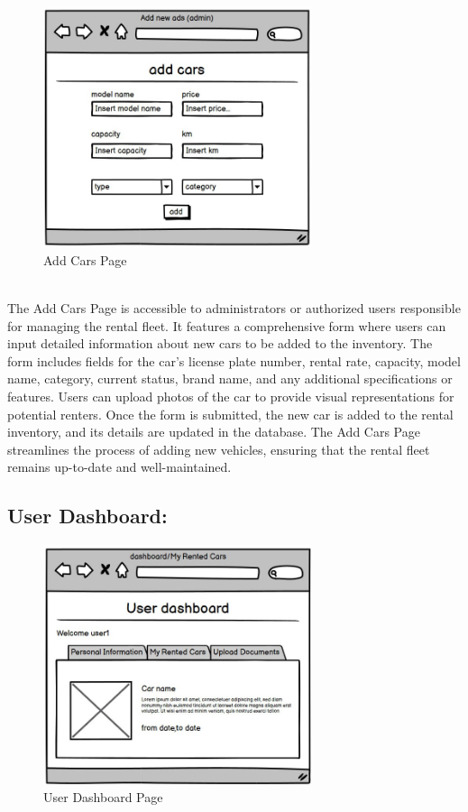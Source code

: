 \begin{figure}[h]
\centering
\includegraphics[width=0.7\textwidth, inner]{sections/AddCars.jpg}
\caption{Add Cars Page}
\end{figure}\\

The Add Cars Page is accessible to administrators or authorized users responsible for managing the rental fleet. It features a comprehensive form where users can input detailed information about new cars to be added to the inventory. The form includes fields for the car's license plate number, rental rate, capacity, model name, category, current status, brand name, and any additional specifications or features. Users can upload photos of the car to provide visual representations for potential renters. Once the form is submitted, the new car is added to the rental inventory, and its details are updated in the database. The Add Cars Page streamlines the process of adding new vehicles, ensuring that the rental fleet remains up-to-date and well-maintained.\newpage
 \subsection{User Dashboard:  }


\begin{figure}[h]
\centering
\includegraphics[width=0.7\textwidth, inner]{sections/UserDashboard.jpg}
\caption{User Dashboard Page}
\end{figure}\\


